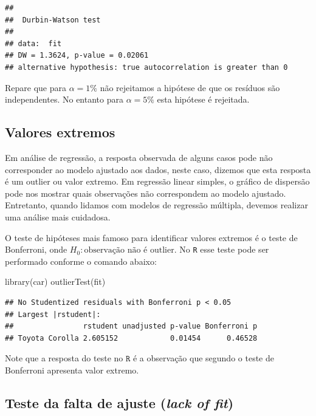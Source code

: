 \documentclass[
]{book}
\newenvironment{Shaded}{\begin{snugshade}}{\end{snugshade}}
\newcommand{\FunctionTok}[1]{\textcolor[rgb]{0.00,0.00,0.00}{#1}}
\newcommand{\NormalTok}[1]{#1}
\begin{document}
\begin{verbatim}
## 
##  Durbin-Watson test
## 
## data:  fit
## DW = 1.3624, p-value = 0.02061
## alternative hypothesis: true autocorrelation is greater than 0
\end{verbatim}

Repare que para \(\alpha=1\%\) não rejeitamos a hipótese de que os resíduos são independentes. No entanto para \(\alpha=5\%\) esta hipótese é rejeitada.

\hypertarget{valores-extremos}{%
\subsection{Valores extremos}\label{valores-extremos}}

Em análise de regressão, a resposta observada de alguns casos pode não corresponder ao modelo ajustado aos dados, neste caso, dizemos que esta resposta é um outlier ou valor extremo. Em regressão linear simples, o gráfico de dispersão pode nos mostrar quais observações não correspondem ao modelo ajustado. Entretanto, quando lidamos com modelos de regressão múltipla, devemos realizar uma análise mais cuidadosa.

O teste de hipóteses mais famoso para identificar valores extremos é o teste de Bonferroni, onde \(H_0:\text{observação não é outlier}\). No \texttt{R} esse teste pode ser performado conforme o comando abaixo:

\begin{Shaded}
\begin{Highlighting}[]
\FunctionTok{library}\NormalTok{(car)}
\FunctionTok{outlierTest}\NormalTok{(fit)}
\end{Highlighting}
\end{Shaded}

\begin{verbatim}
## No Studentized residuals with Bonferroni p < 0.05
## Largest |rstudent|:
##                rstudent unadjusted p-value Bonferroni p
## Toyota Corolla 2.605152            0.01454      0.46528
\end{verbatim}

Note que a resposta do teste no \(\texttt{R}\) é a observação que segundo o teste de Bonferroni apresenta valor extremo.

\hypertarget{teste-da-falta-de-ajuste-lack-of-fit}{%
\subsection{\texorpdfstring{Teste da falta de ajuste (\emph{lack of fit})}{Teste da falta de ajuste (lack of fit)}}\label{teste-da-falta-de-ajuste-lack-of-fit}}
\end{document}
